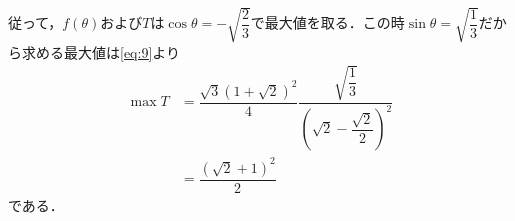 \documentclass[../../main.tex]{subfiles}
\begin{document}
従って，$f(\theta)$および$T$は$\cos\theta=-\sqrt{\dfrac{2}{3}}$で最大値を取る．この時$\sin\theta=\sqrt{\dfrac{1}{3}}$だから求める最大値は\cref{eq:9}より
\begin{align}
  \max T
  &= \dfrac{\sqrt{3}\left(1+\sqrt{2}\right)^2}{4} \dfrac{\sqrt{\dfrac{1}{3}}}{\left(\sqrt{2}-\dfrac{\sqrt{2}}{2}\right)^2} \\
  &= \dfrac{\left(\sqrt{2}+1\right)^2}{2}
\end{align}
である．

\newpage
\end{document}
